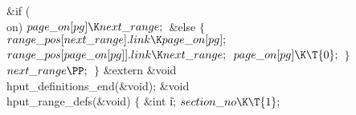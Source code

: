 \&{if} (\\{on})\1\5
${}\index{page on+\\{page\_on}}\\{page\_on}[\index{pg+\\{pg}}\\{pg}]\K\index{next range+\\{next\_range}}\\{next\_range};{}$\2\6
\&{else}\6
\1${}\{{}$\5
${}\index{range pos+\\{range\_pos}}\\{range\_pos}[\index{next range+\\{next\_range}}\\{next\_range}].\index{link+\\{link}}\\{link}\K\index{page on+\\{page\_on}}\\{page\_on}[\index{pg+\\{pg}}\\{pg}];{}$\6
${}\index{range pos+\\{range\_pos}}\\{range\_pos}[\index{page on+\\{page\_on}}\\{page\_on}[\index{pg+\\{pg}}\\{pg}]].\index{link+\\{link}}\\{link}\K\index{next range+\\{next\_range}}\\{next\_range};{}$\6
${}\index{page on+\\{page\_on}}\\{page\_on}[\index{pg+\\{pg}}\\{pg}]\K\T{0};{}$\6
\4${}\}{}$\2\6
${}\index{next range+\\{next\_range}}\\{next\_range}\PP;{}$\6
\4${}\}{}$\2\7
\&{extern} \&{void} \\{hput\_definitions\_end}(\&{void});\7
\&{void} \\{hput\_range\_defs}(\&{void})\1\1\2\2\1\6
\4${}\{{}$\5
\&{int} \|i;\7
${}\index{section no+\\{section\_no}}\\{section\_no}\K\T{1};{}$\6
